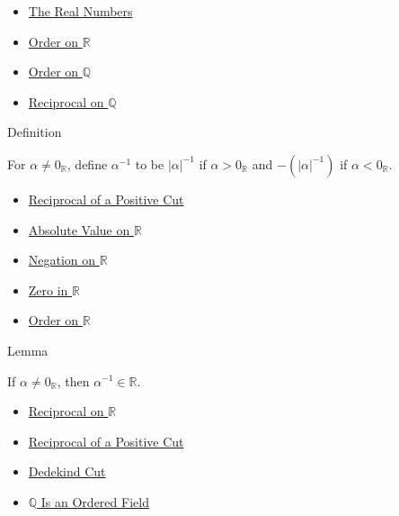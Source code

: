 \begin{dependencies}
\begin{itemize}
  \item \hyperref[def:reals]{The Real Numbers}
  \item \hyperref[def:order-on-r]{Order on $\mathbb{R}$}
  \item \hyperref[def:order-on-q]{Order on $\mathbb{Q}$}
  \item \hyperref[def:reciprocal-on-q-classes]{Reciprocal on $\mathbb{Q}$}
\end{itemize}
\end{dependencies}

\begin{definitionbox}{Definition}
\begin{definition}
\label{def:reciprocal-on-r}
For $\alpha\ne0_{\mathbb{R}}$, define $\alpha^{-1}$ to be $|\alpha|^{-1}$ if
$\alpha>0_{\mathbb{R}}$ and $-(|\alpha|^{-1})$ if $\alpha<0_{\mathbb{R}}$.
\end{definition}
\end{definitionbox}

\begin{dependencies}
\begin{itemize}
  \item \hyperref[def:reciprocal-positive-on-r]{Reciprocal of a Positive Cut}
  \item \hyperref[def:real-chapter-absolute-value-on-r]{Absolute Value on $\mathbb{R}$}
  \item \hyperref[def:negation-on-r]{Negation on $\mathbb{R}$}
  \item \hyperref[def:zero-in-r]{Zero in $\mathbb{R}$}
  \item \hyperref[def:order-on-r]{Order on $\mathbb{R}$}
\end{itemize}
\end{dependencies}

\begin{lemmabox}{Lemma}
\begin{lemma}
\label{lem:reciprocal-is-a-cut}
If $\alpha\ne0_{\mathbb{R}}$, then $\alpha^{-1}\in\mathbb{R}$.
\end{lemma}
\end{lemmabox}

\begin{dependencies}
\begin{itemize}
  \item \hyperref[def:reciprocal-on-r]{Reciprocal on $\mathbb{R}$}
  \item \hyperref[def:reciprocal-positive-on-r]{Reciprocal of a Positive Cut}
  \item \hyperref[def:dedekind-cut]{Dedekind Cut}
  \item \hyperref[thm:q-is-an-ordered-field]{$\mathbb{Q}$ Is an Ordered Field}
\end{itemize}
\end{dependencies}

